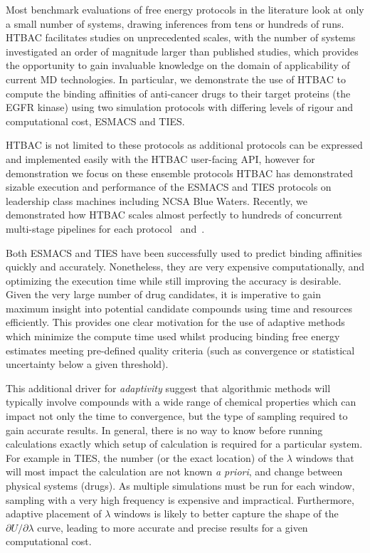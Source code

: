 \documentclass[conference]{IEEEtran}
\begin{document}
Most benchmark evaluations of free energy protocols in the literature look 
at only a small number of systems, drawing inferences from tens or hundreds 
of runs. HTBAC facilitates studies on unprecedented scales, with the number 
of systems investigated an order of magnitude larger than published studies, 
which provides the opportunity to gain invaluable knowledge on the domain of 
applicability of current MD technologies. In particular, we demonstrate the 
use of HTBAC to compute the binding affinities of anti-cancer drugs to their 
target proteins (the EGFR kinase) using two simulation protocols with differing 
levels of rigour and computational cost, ESMACS and TIES.

HTBAC is not limited to these protocols as additional protocols can be 
expressed and implemented easily with the HTBAC user-facing API, however for 
demonstration we focus on these ensemble protocols HTBAC has demonstrated 
sizable execution and performance of the ESMACS and TIES protocols on leadership
class machines including NCSA Blue Waters. Recently, we demonstrated how HTBAC 
scales almost perfectly to hundreds of concurrent multi-stage pipelines for each
protocol~\cite{dakka2017} and~\cite{dakka_farkaspall}. 

Both ESMACS and TIES have been successfully used to predict binding affinities
quickly and accurately. Nonetheless, they are very expensive computationally,
and optimizing the execution time while still improving the accuracy is
desirable. Given the very large number of drug candidates, it is imperative to
gain maximum insight into potential candidate compounds using time and
resources efficiently. This provides one clear motivation for the use of
adaptive methods which minimize the compute time used whilst producing binding
free energy estimates meeting pre-defined quality criteria (such as
convergence or statistical uncertainty below a given threshold).

This additional driver for \textit{adaptivity} suggest that algorithmic methods will
typically involve compounds with a wide range of chemical properties which can
impact not only the time to convergence, but the type of sampling required to
gain accurate results. In general, there is no way to know before running
calculations exactly which setup of calculation is required for a particular
system. For example in TIES, the number (or the exact location) of the
$\lambda$ windows that will most impact the calculation are not known
\textit{a priori}, and change between physical systems (drugs). As multiple
simulations must be run for each window, sampling with a very high frequency
is expensive and impractical. Furthermore, adaptive placement of $\lambda$
windows is likely to better capture the shape of the 
$\partial U/\partial\lambda$ curve, leading to more accurate and precise 
results for a given computational cost.
\end{document}
